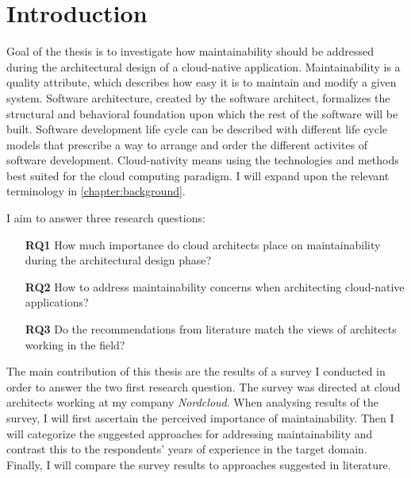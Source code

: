 \documentclass[utf8,english]{gradu3}
\begin{document}

\mainmatter


\chapter{Introduction}

Goal of the thesis is to investigate how maintainability should be addressed
during the architectural design of a cloud-native application.  Maintainability
is a quality attribute, which describes how easy it is to maintain and modify a
given system. Software architecture, created by the software architect,
formalizes the structural and behavioral foundation upon which the rest of the
software will be built. Software development life cycle can be described with
different life cycle models that prescribe a way to arrange and order the
different activites of software development. Cloud-nativity means using the
technologies and methods best suited for the cloud computing paradigm. I will
expand upon the relevant terminology in \autoref{chapter:background}.

I aim to answer three research questions:
\begin{itemize}
  \item [\textbf{RQ1}] How much importance do cloud architects place on
        maintainability during the architectural design phase?
  \item [\textbf{RQ2}] How to address maintainability concerns when architecting
        cloud-native applications?
  \item [\textbf{RQ3}] Do the recommendations from literature match the views of
        architects working in the field?
\end{itemize}

The main contribution of this thesis are the results of a survey I conducted in
order to answer the two first research question. The survey was directed at
cloud architects working at my company \textit{Nordcloud}. When analysing
results of the survey, I will first ascertain the perceived importance of
maintainability. Then I will categorize the suggested approaches for addressing
maintainability and contrast this to the respondents' years of experience in the
target domain. Finally, I will compare the survey results to approaches
suggested in literature.
\end{document}
